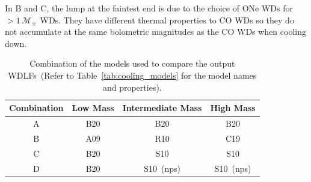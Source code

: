 \documentclass[fleqn,usenatbib]{rasti}
\newcommand{\msun}{\mathcal{M}_{\sun}}
\begin{document}
In B and C, the lump at the faintest end is due to the choice of ONe WDs for
$>1\,\msun$ WDs. They have different thermal properties to CO WDs so
they do not accumulate at the same bolometric magnitudes as the CO WDs when
cooling down.

\begin{table}
    \centering
    \begin{tabular}{cccc}
        Combination & Low Mass & Intermediate Mass & High Mass \\ \hline\hline
        A           & B20      & B20               & B20 \\
        B           & A09      & R10               & C19 \\
        C           & B20      & S10               & S10 \\
        D           & B20      & S10~(nps)         & S10~(nps) \\
    \end{tabular}
    \caption{Combination of the models used to compare the output WDLFs~(Refer
    to Table~\ref{tab:cooling_models} for the model names and properties).}
    \label{tab:cooling_model_combination}
\end{table}
\end{document}
